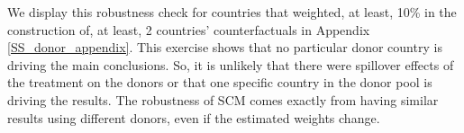 \documentclass[12pt]{article}
\newcommand{\annote}[1]{\parbox{\textwidth}{\renewcommand{\baselinestretch}{1.0}\vspace{12pt} \small Notes: #1}}
\begin{document}
We display this robustness check for countries that weighted, at least, 10\% in the construction of, at least, 2 countries' counterfactuals in Appendix \ref{SS_donor_appendix}. This exercise shows that no particular donor country is driving the main conclusions. So, it is unlikely that there were spillover effects of the treatment on the donors or that one specific country in the donor pool is driving the results. The robustness of SCM comes exactly from having similar results using different donors, even if the estimated weights change.




\end{document}
